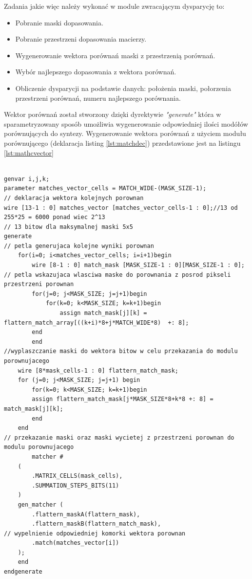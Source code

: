 Zadania jakie więc należy wykonać w module zwracającym dysparycję to:

\begin{itemize}
\item Pobranie maski dopasowania.
\item Pobranie przestrzeni dopasowania macierzy.
\item Wygenerowanie wektora porównań maski z przestrzenią porównań.
\item Wybór najlepszego dopasowania z wektora porównań.
\item Obliczenie dysparycji na podstawie danych: położenia maski,
    połorzenia przestrzeni porównań, numeru najlepszego porównania.
\end{itemize}

Wektor porównań został stworzony dzięki dyrektywie \textit{"generate"}
która w sparametryzowany sposób umożliwia wygenerowanie odpowiedniej ilości
modółów porównujących do syntezy. Wygenerowanie wektora porównań z użyciem
modułu porównującego (deklaracja listing \ref{lst:matchdec}) przedstawione jest
na listingu \ref{lst:mathcvector}

\begin{lstlisting}[label={lst:matchdec},
caption={wygenerowywanie wektora porównań macierzy z przestrzenią porównań}]

genvar i,j,k;
parameter matches_vector_cells = MATCH_WIDE-(MASK_SIZE-1);
// deklaracja wektora kolejnych porownan
wire [13-1 : 0] matches_vector [matches_vector_cells-1 : 0];//13 od 255*25 = 6000 ponad wiec 2^13
// 13 bitow dla maksymalnej maski 5x5
generate
// petla generujaca kolejne wyniki porownan
    for(i=0; i<matches_vector_cells; i=i+1)begin
        wire [8-1 : 0] match_mask [MASK_SIZE-1 : 0][MASK_SIZE-1 : 0];
// petla wskazujaca wlasciwa maske do porownania z posrod pikseli przestrzeni porownan
        for(j=0; j<MASK_SIZE; j=j+1)begin
            for(k=0; k<MASK_SIZE; k=k+1)begin
                assign match_mask[j][k] = flattern_match_array[((k+i)*8+j*MATCH_WIDE*8)  +: 8];
	    end
        end
//wyplaszczanie maski do wektora bitow w celu przekazania do modulu porownujacego
	wire [8*mask_cells-1 : 0] flattern_match_mask;
	for (j=0; j<MASK_SIZE; j=j+1) begin
	    for(k=0; k<MASK_SIZE; k=k+1)begin
		assign flattern_match_mask[j*MASK_SIZE*8+k*8 +: 8] = match_mask[j][k];
	    end
	end
// przekazanie maski oraz maski wycietej z przestrzeni porownan do modulu porownujacego
        matcher # 
	(
	    .MATRIX_CELLS(mask_cells),
	    .SUMMATION_STEPS_BITS(11)
	)
	gen_matcher (
	    .flattern_maskA(flattern_mask),
	    .flattern_maskB(flattern_match_mask),
// wypelnienie odpowiedniej komorki wektora porownan
	    .match(matches_vector[i])
	);
    end
endgenerate

\end{lstlisting}

